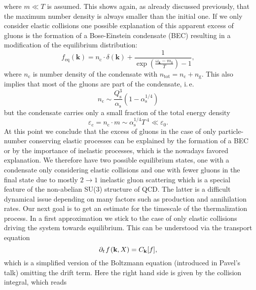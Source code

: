 where $m\ll T$ is assumed. This shows again, as already discussed previously, that the maximum number density is always smaller than the initial one. If we only consider elastic collisions one possible explanation of this apparent excess of gluons is the formation of a Bose-Einstein condensate (BEC) resulting in a modification of the equilibrium distribution:
\begin{equation}
	f_{\mathrm{eq}}(\mathbf{k}) = n_{\mathrm{c}}\cdot\delta(\mathbf{k}) + \frac{1}{\exp\left(\frac{\omega_{\mathbf{k}}-m_0}{T}\right)-1},
\end{equation}
where $n_{\mathrm{c}}$ is number density of the condensate with $n_{\mathrm{tot}} = n_{\mathrm{c}} + n_{\mathrm{g}}$. This also implies that most of the gluons are part of the condensate, i.\,e.
\begin{equation}
	 n_{\mathrm{c}} \sim  \frac{Q_{\mathrm{s}}^3}{\alpha_{\mathrm{s}}}\left(1-\alpha_{\mathrm{s}}^{1/4}\right)  
\end{equation}
but the condensate carries only a small fraction of the total energy density
\begin{equation}
	\varepsilon_{\mathrm{c}} = n_{\mathrm{c}}\cdot m \sim \alpha_{\mathrm{s}}^{1/4}T^{\phantom{.}4} \ll \varepsilon_0.
\end{equation}
At this point we conclude that the excess of gluons in the case of only particle-number conserving elastic processes can be explained by the formation of a BEC or by the importance of inelastic processes, which is the nowadays favored explanation. We therefore have two possible equilibrium states, one with a condensate only considering elastic collisions and one with fewer gluons in the final state due to mostly $2\rightarrow 1$ inelastic gluon scattering which is a special feature of the non-abelian SU(3) structure of QCD. The latter is a difficult dynamical issue depending on many factors such as production and annihilation rates.\newpage
\noindent
Our next goal is to get an estimate for the timescale of the thermalization process. In a first approximation we stick to the case of only elastic collisions driving the system towards equilibrium. This can be understood via the transport equation
\begin{equation}
		\partial_t\hspace{0.1em} f\hspace{0.1em}(\mathbf{k},X) = C_{\mathbf{k}}[f],\label{eqn:transport}
\end{equation}
which is a simplified version of the Boltzmann equation (introduced in Pavel's talk) omitting the drift term. Here the right hand side is given by the collision integral, which reads 	
